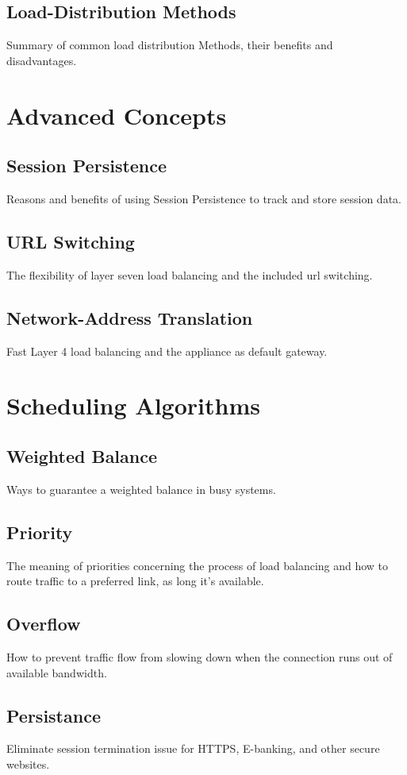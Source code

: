 \documentclass[12p]{article}
\begin{document}
	\subsection{Load-Distribution Methods}
	Summary of common load distribution Methods, their benefits and disadvantages.
	
	\newpage
	\section{Advanced Concepts}
	\subsection{Session Persistence}
	Reasons and benefits of using Session Persistence to track and store session data.
	\subsection{URL Switching}
	The flexibility of layer seven load balancing and the included url switching.
	\subsection{Network-Address Translation}
	Fast Layer 4 load balancing and the appliance as default gateway.
	
	\newpage
	\section{Scheduling Algorithms}
	\subsection{Weighted Balance}
	Ways to guarantee a weighted balance in busy systems.
	\subsection{Priority}
	The meaning of priorities concerning the process of load balancing and how to route traffic to a preferred link, as long it's available.
	\subsection{Overflow}
	How to prevent traffic flow from slowing down when the connection runs out of available bandwidth.
	\subsection{Persistance}
	Eliminate session termination issue for HTTPS, E-banking, and other secure websites.
\end{document}
